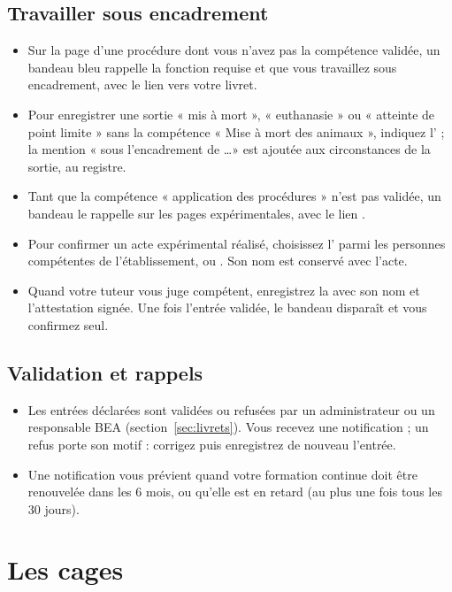 \documentclass[11pt,a4paper]{article}
\begin{document}
\subsection{Travailler sous encadrement}
\begin{itemize}
  \item Sur la page d'une procédure dont vous n'avez pas la compétence
    validée, un bandeau bleu  rappelle la fonction
    requise et que vous travaillez sous encadrement, avec le lien vers votre
    livret.
  \item Pour enregistrer une sortie « mis à mort », « euthanasie » ou
    « atteinte de point limite » sans la compétence « Mise à mort des
    animaux », indiquez l' ; la mention
    « sous l'encadrement de \ldots » est ajoutée aux circonstances de la
    sortie, au registre.
  \item Tant que la compétence « application des procédures » n'est pas
    validée, un bandeau  le rappelle sur les
    pages expérimentales, avec le lien .
  \item Pour confirmer un acte expérimental réalisé, choisissez
    l' parmi les personnes compétentes de
    l'établissement, ou . Son nom est conservé avec
    l'acte.
  \item Quand votre tuteur vous juge compétent, enregistrez la
     avec son nom et l'attestation signée. Une fois
    l'entrée validée, le bandeau disparaît et vous confirmez seul.
\end{itemize}

\subsection{Validation et rappels}
\begin{itemize}
  \item Les entrées déclarées sont validées ou refusées par un
    administrateur ou un responsable BEA (section~\ref{sec:livrets}). Vous recevez
    une notification ; un refus porte son motif : corrigez puis
    enregistrez de nouveau l'entrée.
  \item Une notification vous prévient quand votre formation continue doit
    être renouvelée dans les 6 mois, ou qu'elle est en retard (au plus une
    fois tous les 30 jours).
\end{itemize}

\section{Les cages}\label{sec:cages}
\end{document}
